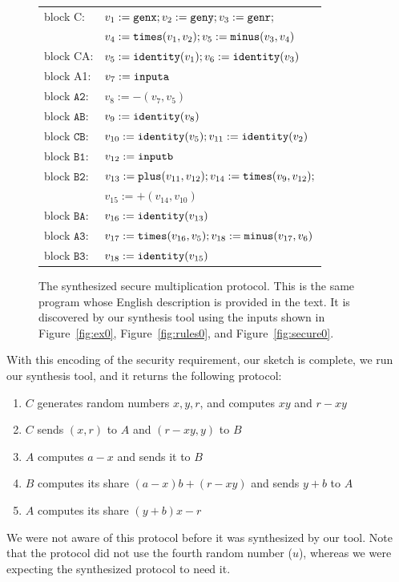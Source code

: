 \documentclass[preprint]{sig-alternate-05-2015}
\begin{document}
\begin{figure}[ht]
  \begin{tt}
    \begin{tabular}{|ll|}
      \hline
      block C: & $v_1 := \mbox{${\mathtt{genx}}$}; v_2 := \mbox{${\mathtt{geny}}$}; v_3 := \mbox{${\mathtt{genr}}$};$
      \\
                 & $v_4 := \mbox{${\mathtt{times}}$}(v_1,v_2); v_5 := \mbox{${\mathtt{minus}}$}(v_3,v_4)$
      \\
      block CA: & $v_5 := \mbox{${\mathtt{identity}}$}(v_1); v_6 := \mbox{${\mathtt{identity}}$}(v_3)$
      \\
      block A1: & $v_7 := \mbox{${\mathtt{inputa}}$}$
      \\
      block $\mathtt{A2}$: & $v_8 := \minus(v_7, v_5)$
      \\
      block $\mathtt{AB}$: & $v_9 := \mbox{${\mathtt{identity}}$}(v_8)$
       \\ 
       block $\mathtt{CB}$: & $v_{10} := \mbox{${\mathtt{identity}}$}(v_5); v_{11} := \mbox{${\mathtt{identity}}$}(v_2)$
       \\ 
       block $\mathtt{B1}$: & $v_{12} := \mbox{${\mathtt{inputb}}$}$
       \\
       block $\mathtt{B2}$: & $v_{13} := \mbox{${\mathtt{plus}}$}(v_{11}, v_{12}); v_{14} := \mbox{${\mathtt{times}}$}(v_9,v_{12});$ 
       \\ &
       $v_{15} := \plus(v_{14}, v_{10})$ 
       \\ 
       block $\mathtt{BA}$: & $v_{16} := \mbox{${\mathtt{identity}}$}(v_{13})$ 
       \\ 
       block $\mathtt{A3}$: & $v_{17} := \mbox{${\mathtt{times}}$}(v_{16}, v_5); 
       v_{18} := \mbox{${\mathtt{minus}}$}(v_{17}, v_6)$
       \\ 
       block $\mathtt{B3}$: & $v_{18} := \mbox{${\mathtt{identity}}$}(v_{15})$
       \\ \hline
    \end{tabular}
  \end{tt}
  \caption{The synthesized secure multiplication protocol. This is the 
    same program whose English description is provided in the text. It is 
  discovered by our synthesis tool using the inputs shown in 
Figure~\ref{fig:ex0}, Figure~\ref{fig:rules0}, and Figure~\ref{fig:secure0}.}
\end{figure}

With this encoding of the security requirement, our sketch is complete,
we run our synthesis tool, and it returns the following protocol:
\begin{enumerate}
  \item
    $C$ generates random numbers $x,y,r$, and computes $xy$ and $r-xy$
  \item
    $C$ sends $(x,r)$ to $A$ and $(r-xy,y)$ to $B$
  \item
    $A$ computes $a-x$ and sends it to $B$
  \item
    $B$ computes its share $(a-x)b + (r-xy)$ and sends $y+b$ to $A$
  \item
    $A$ computes its share $(y+b)x-r$
\end{enumerate}
We were not aware of this protocol before it was synthesized by our tool.
Note that the protocol did not use the fourth random number ($u$), whereas
we were expecting the synthesized protocol to need it.
\end{document}
